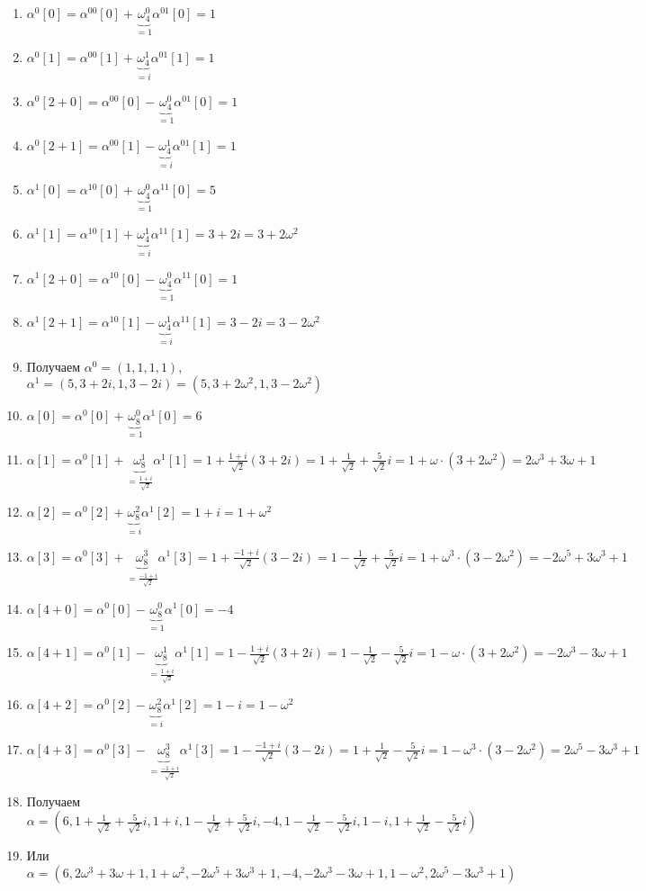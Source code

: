 \documentclass[a4paper]{article}
\begin{document}
\begin{enumerate}
\begin{enumerate}
\item $\alpha^0[0]=\alpha^{00}[0]+\underbrace{\omega_4^0}_{=1}\alpha^{01}[0]=1$
\item $\alpha^0[1]=\alpha^{00}[1]+\underbrace{\omega_4^1}_{=i}\alpha^{01}[1]=1$
\item $\alpha^0[2+0]=\alpha^{00}[0]-\underbrace{\omega_4^0}_{=1}\alpha^{01}[0]=1$
\item $\alpha^0[2+1]=\alpha^{00}[1]-\underbrace{\omega_4^1}_{=i}\alpha^{01}[1]=1$
\newpage
\item $\alpha^1[0]=\alpha^{10}[0]+\underbrace{\omega_4^0}_{=1}\alpha^{11}[0]=5$
\item $\alpha^1[1]=\alpha^{10}[1]+\underbrace{\omega_4^1}_{=i}\alpha^{11}[1]=3+2i=3+2\omega^2$
\item $\alpha^1[2+0]=\alpha^{10}[0]-\underbrace{\omega_4^0}_{=1}\alpha^{11}[0]=1$
\item $\alpha^1[2+1]=\alpha^{10}[1]-\underbrace{\omega_4^1}_{=i}\alpha^{11}[1]=3-2i=3-2\omega^2$
\item Получаем $\alpha^0=(1,1,1,1)$, $\alpha^1=(5,3+2i,1,3-2i)=(5,3+2\omega^2,1,3-2\omega^2)$
\item $\alpha[0]=\alpha^0[0]+\underbrace{\omega_8^0}_{=1}\alpha^1[0]=6$
\item $\alpha[1]=\alpha^0[1]+\underbrace{\omega_8^1}_{=\frac{1+i}{\sqrt{2}}}\alpha^1[1]=1+\frac{1+i}{\sqrt{2}}(3+2i)=1+\frac{1}{\sqrt{2}}+\frac{5}{\sqrt{2}}i=1+\omega\cdot(3+2\omega^2)=2\omega^3+3\omega+1$
\item $\alpha[2]=\alpha^0[2]+\underbrace{\omega_8^2}_{=i}\alpha^1[2]=1+i=1+\omega^2$
\item $\alpha[3]=\alpha^0[3]+\underbrace{\omega_8^3}_{=\frac{-1+i}{\sqrt{2}}}\alpha^1[3]=1+\frac{-1+i}{\sqrt{2}}(3-2i)=1-\frac{1}{\sqrt{2}}+\frac{5}{\sqrt{2}}i=1+\omega^3\cdot(3-2\omega^2)=-2\omega^5+3\omega^3+1$

\item $\alpha[4+0]=\alpha^0[0]-\underbrace{\omega_8^0}_{=1}\alpha^1[0]=-4$
\item $\alpha[4+1]=\alpha^0[1]-\underbrace{\omega_8^1}_{=\frac{1+i}{\sqrt{2}}}\alpha^1[1]=1-\frac{1+i}{\sqrt{2}}(3+2i)=1-\frac{1}{\sqrt{2}}-\frac{5}{\sqrt{2}}i=1-\omega\cdot(3+2\omega^2)=-2\omega^3-3\omega+1$
\item $\alpha[4+2]=\alpha^0[2]-\underbrace{\omega_8^2}_{=i}\alpha^1[2]=1-i=1-\omega^2$
\item $\alpha[4+3]=\alpha^0[3]-\underbrace{\omega_8^3}_{=\frac{-1+i}{\sqrt{2}}}\alpha^1[3]=1-\frac{-1+i}{\sqrt{2}}(3-2i)=1+\frac{1}{\sqrt{2}}-\frac{5}{\sqrt{2}}i=1-\omega^3\cdot(3-2\omega^2)=2\omega^5-3\omega^3+1$
\item Получаем $\alpha=(6,1+\frac{1}{\sqrt{2}}+\frac{5}{\sqrt{2}}i,1+i,1-\frac{1}{\sqrt{2}}+\frac{5}{\sqrt{2}}i,-4,1-\frac{1}{\sqrt{2}}-\frac{5}{\sqrt{2}}i,1-i,1+\frac{1}{\sqrt{2}}-\frac{5}{\sqrt{2}}i)$
\item Или $\alpha=(6,2\omega^3+3\omega+1,1+\omega^2,-2\omega^5+3\omega^3+1,-4,-2\omega^3-3\omega+1,1-\omega^2,2\omega^5-3\omega^3+1)$
\end{enumerate}



\end{enumerate}
\end{document}
